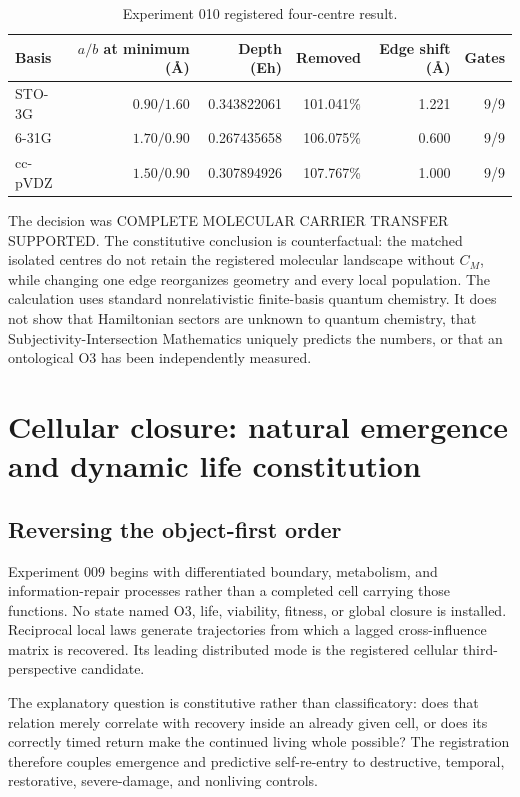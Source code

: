 \documentclass[11pt,a4paper]{article}
\begin{document}
\begin{table}[H]
\centering
\footnotesize
\caption{Experiment 010 registered four-centre result.}
\begin{tabular}{@{}lrrrrr@{}}
\toprule
Basis & $a/b$ at minimum (\AA) & Depth (Eh) & Removed & Edge shift (\AA) & Gates \\
\midrule
STO-3G & $0.90/1.60$ & 0.343822061 & 101.041\% & 1.221 & 9/9 \\
6-31G & $1.70/0.90$ & 0.267435658 & 106.075\% & 0.600 & 9/9 \\
cc-pVDZ & $1.50/0.90$ & 0.307894926 & 107.767\% & 1.000 & 9/9 \\
\bottomrule
\end{tabular}
\end{table}

The decision was \textsf{COMPLETE MOLECULAR CARRIER TRANSFER SUPPORTED}. The constitutive conclusion is counterfactual: the matched isolated centres do not retain the registered molecular landscape without $C_M$, while changing one edge reorganizes geometry and every local population. The calculation uses standard nonrelativistic finite-basis quantum chemistry. It does not show that Hamiltonian sectors are unknown to quantum chemistry, that Subjectivity-Intersection Mathematics uniquely predicts the numbers, or that an ontological O3 has been independently measured.

\section{Cellular closure: natural emergence and dynamic life constitution}

\subsection{Reversing the object-first order}

Experiment 009 begins with differentiated boundary, metabolism, and information-repair processes rather than a completed cell carrying those functions. No state named O3, life, viability, fitness, or global closure is installed. Reciprocal local laws generate trajectories from which a lagged cross-influence matrix is recovered. Its leading distributed mode is the registered cellular third-perspective candidate.

The explanatory question is constitutive rather than classificatory: does that relation merely correlate with recovery inside an already given cell, or does its correctly timed return make the continued living whole possible? The registration therefore couples emergence and predictive self-re-entry to destructive, temporal, restorative, severe-damage, and nonliving controls.
\end{document}
